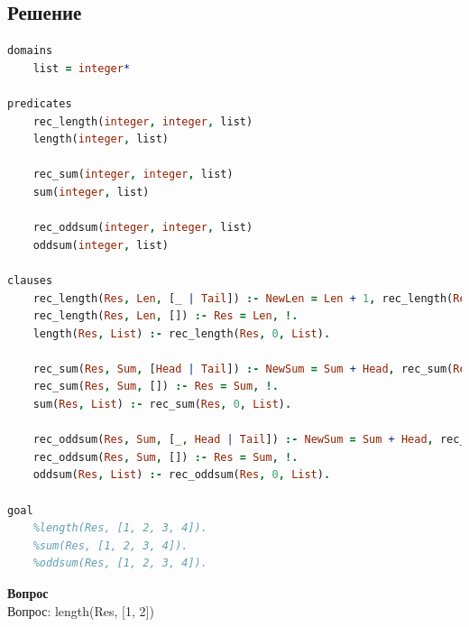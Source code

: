 \documentclass[12pt]{report}
\begin{document}
\subsection*{Решение}
\begin{lstlisting}[language=prolog]
domains
	list = integer*

predicates
	rec_length(integer, integer, list)
	length(integer, list)

	rec_sum(integer, integer, list)
	sum(integer, list)

	rec_oddsum(integer, integer, list)
	oddsum(integer, list)

clauses
	rec_length(Res, Len, [_ | Tail]) :- NewLen = Len + 1, rec_length(Res, NewLen, Tail).
	rec_length(Res, Len, []) :- Res = Len, !.
	length(Res, List) :- rec_length(Res, 0, List).

	rec_sum(Res, Sum, [Head | Tail]) :- NewSum = Sum + Head, rec_sum(Res, NewSum, Tail).
	rec_sum(Res, Sum, []) :- Res = Sum, !.
	sum(Res, List) :- rec_sum(Res, 0, List).

	rec_oddsum(Res, Sum, [_, Head | Tail]) :- NewSum = Sum + Head, rec_oddsum(Res, NewSum, Tail).
	rec_oddsum(Res, Sum, []) :- Res = Sum, !.
	oddsum(Res, List) :- rec_oddsum(Res, 0, List).

goal
	%length(Res, [1, 2, 3, 4]).
	%sum(Res, [1, 2, 3, 4]).
	%oddsum(Res, [1, 2, 3, 4]).
\end{lstlisting}

\newpage

\textbf{Вопрос}\\

Вопрос: length(Res, [1, 2])
\end{document}
